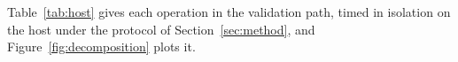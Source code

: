 \documentclass[pdflatex,sn-basic,twocolumn]{sn-jnl}%
\providecommand{\DIFdelbegin}{} %
\newcommand{\DIFscaledelfig}{0.5}
\newlength{\DIFdelgraphicswidth} %
\newlength{\DIFdelgraphicsheight} %
\newcommand{\DIFdelincludegraphics}[2][]{%
\sbox{\DIFdelgraphicsbox}{\DIFOincludegraphics[#1]{#2}}%
\settoboxwidth{\DIFdelgraphicswidth}{\DIFdelgraphicsbox} %
\settoboxtotalheight{\DIFdelgraphicsheight}{\DIFdelgraphicsbox} %
\scalebox{\DIFscaledelfig}{%
\parbox[b]{\DIFdelgraphicswidth}{\usebox{\DIFdelgraphicsbox}\\[-\baselineskip] \rule{\DIFdelgraphicswidth}{0em}}\llap{\resizebox{\DIFdelgraphicswidth}{\DIFdelgraphicsheight}{%
\setlength{\unitlength}{\DIFdelgraphicswidth}%
\begin{picture}(1,1)%
\thicklines\linethickness{2pt} %
{\color[rgb]{1,0,0}\put(0,0){\framebox(1,1){}}}%
{\color[rgb]{1,0,0}\put(0,0){\line( 1,1){1}}}%
{\color[rgb]{1,0,0}\put(0,1){\line(1,-1){1}}}%
\end{picture}%
}\hspace*{3pt}}} %
} %
\DeclareRobustCommand{\DIFdelbegin}{\DIFOdelbegin \let\includegraphics\DIFdelincludegraphics} %
\begin{document}
Table~\ref{tab:host} gives each operation in the validation path, timed in
isolation on the host under the protocol of Section~\ref{sec:method}, and
Figure~\ref{fig:decomposition} plots it.

\DIFdelbegin %
\end{document}
